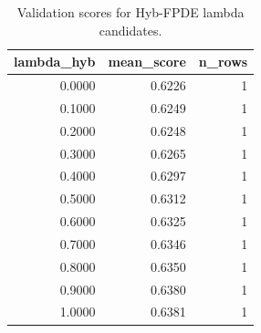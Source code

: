 \begin{table}[t]
\caption{Validation scores for Hyb-FPDE lambda candidates.}
\label{tab:lambda_distribution_computed}
\centering
\begin{tabular}{rrr}
\toprule
lambda\_hyb & mean\_score & n\_rows \\
\midrule
0.0000 & 0.6226 & 1 \\
0.1000 & 0.6249 & 1 \\
0.2000 & 0.6248 & 1 \\
0.3000 & 0.6265 & 1 \\
0.4000 & 0.6297 & 1 \\
0.5000 & 0.6312 & 1 \\
0.6000 & 0.6325 & 1 \\
0.7000 & 0.6346 & 1 \\
0.8000 & 0.6350 & 1 \\
0.9000 & 0.6380 & 1 \\
1.0000 & 0.6381 & 1 \\
\bottomrule
\end{tabular}

\end{table}
